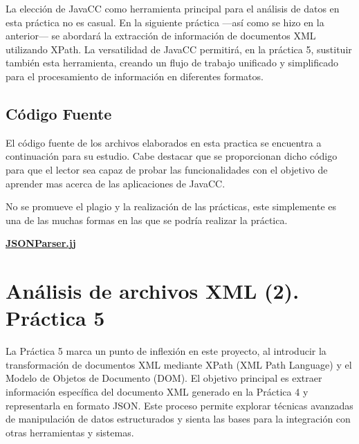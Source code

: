 
La elección de JavaCC como herramienta principal para el análisis de datos en esta práctica no es casual. En la siguiente práctica ---así como se hizo en la anterior--- se abordará la extracción de información de documentos XML utilizando XPath. La versatilidad de JavaCC permitirá, en la práctica 5, sustituir también esta herramienta, creando un flujo de trabajo unificado y simplificado para el procesamiento de información en diferentes formatos.

\subsection{Código Fuente}

\noindent El código fuente de los archivos elaborados en esta practica se encuentra a continuación para su estudio. Cabe destacar que se proporcionan dicho código para que el lector sea capaz de probar las funcionalidades con el objetivo de aprender mas acerca de las aplicaciones de JavaCC.

No se promueve el plagio y la realización de las prácticas, este simplemente es una de las muchas formas en las que se podría realizar la práctica.

\hyperref[sec:JSONParser]{\textbf{JSONParser.jj}}

\section{Análisis de archivos XML (2). Práctica 5}


\noindent La Práctica 5 marca un punto de inflexión en este proyecto, al introducir la transformación de documentos XML mediante XPath (XML Path Language) y el Modelo de Objetos de Documento (DOM). El objetivo principal es extraer información específica del documento XML generado en la Práctica 4 y representarla en formato JSON. Este proceso permite explorar técnicas avanzadas de manipulación de datos estructurados y sienta las bases para la integración con otras herramientas y sistemas.

